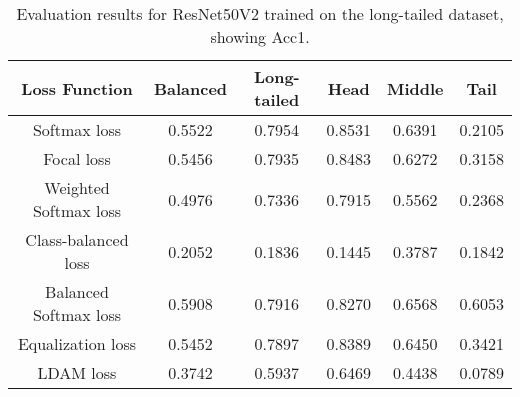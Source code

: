 \begin{table}[H]
    \centering
    \begin{tabular}{cccccc}
        \toprule
        Loss Function & Balanced & Long-tailed & Head & Middle & Tail \\ 
        \midrule
        Softmax loss   & 0.5522 & 0.7954 & 0.8531 & 0.6391 & 0.2105 \\
        Focal loss   & 0.5456 & 0.7935 & 0.8483 & 0.6272 & 0.3158 \\
        Weighted Softmax loss   & 0.4976 & 0.7336 & 0.7915 & 0.5562 & 0.2368 \\
        Class-balanced loss   & 0.2052 & 0.1836 &  0.1445 & 0.3787 & 0.1842 \\
        Balanced Softmax loss   & 0.5908 & 0.7916 & 0.8270 & 0.6568 & 0.6053 \\
        Equalization loss   & 0.5452 & 0.7897 & 0.8389 & 0.6450 & 0.3421 \\
        LDAM loss   & 0.3742 & 0.5937 & 0.6469 & 0.4438 & 0.0789 \\
        \bottomrule
    \end{tabular}
    \caption{Evaluation results for ResNet50V2 trained on the long-tailed dataset, showing Acc1.}
    \label{tab:resnet_lt_acc1}
\end{table}

